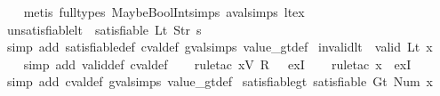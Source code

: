 \begin{isabellebody}
\ \ \isamarkupfalse%
\ {\isacharparenleft}metis\ {\isacharparenleft}full{\isacharunderscore}types{\isacharparenright}\ MaybeBoolInt{\isachardot}simps{\isacharparenleft}{}{\isacharparenright}\ aval{\isachardot}simps{\isacharparenleft}{}{\isacharparenright}\ lt{\isacharunderscore}ex{\isacharparenright}%
\endisatagproof
{\isafoldproof}%
%
\isadelimproof
\isanewline
%
\endisadelimproof
\isanewline
{}\isamarkupfalse%
\ unsatisfiable{\isacharunderscore}lt{\isacharcolon}\ {\isachardoublequoteopen}{\isasymnot}\ satisfiable\ {\isacharparenleft}Lt\ {\isacharparenleft}Str\ s{\isacharparenright}{\isacharparenright}{\isachardoublequoteclose}\isanewline
%
\isadelimproof
\ \ %
\endisadelimproof
%
\isatagproof
{}\isamarkupfalse%
\ {\isacharparenleft}simp\ add{\isacharcolon}\ satisfiable{\isacharunderscore}def\ cval{\isacharunderscore}def\ gval{\isachardot}simps\ value_gt{\isacharunderscore}def{\isacharparenright}%
\endisatagproof
{\isafoldproof}%
%
\isadelimproof
\isanewline
%
\endisadelimproof
\isanewline
{}\isamarkupfalse%
\ invalid{\isacharunderscore}lt{\isacharcolon}\ {\isachardoublequoteopen}{\isasymnot}\ valid\ {\isacharparenleft}Lt\ x{\isacharparenright}{\isachardoublequoteclose}\isanewline
%
\isadelimproof
\ \ %
\endisadelimproof
%
\isatagproof
{}\isamarkupfalse%
\ {\isacharparenleft}simp\ add{\isacharcolon}\ valid{\isacharunderscore}def\ cval{\isacharunderscore}def{\isacharparenright}\isanewline
\ \ \isamarkupfalse%
\ {\isacharparenleft}rule{\isacharunderscore}tac\ x{\isacharequal}{\isachardoublequoteopen}V\ {\isacharparenleft}R\ {}{\isacharparenright}{\isachardoublequoteclose}\ \ exI{\isacharparenright}\isanewline
\ \ \isamarkupfalse%
\ {\isacharparenleft}rule{\isacharunderscore}tac\ x{\isacharequal}{\isachardoublequoteopen}{\isacharless}{\isachargreater}{\isachardoublequoteclose}\ \ exI{\isacharparenright}\isanewline
\ \ \isamarkupfalse%
\ {\isacharparenleft}simp\ add{\isacharcolon}\ cval{\isacharunderscore}def\ gval{\isachardot}simps\ value_gt{\isacharunderscore}def{\isacharparenright}%
\endisatagproof
{\isafoldproof}%
%
\isadelimproof
\isanewline
%
\endisadelimproof
\isanewline
{}\isamarkupfalse%
\ satisfiable{\isacharunderscore}gt{\isacharcolon}\ {\isachardoublequoteopen}satisfiable\ {\isacharparenleft}Gt\ {\isacharparenleft}Num\ x{}{\isacharparenright}{\isacharparenright}{\isachardoublequoteclose}\isanewline
%
\isadelimproof
\ \ %
\endisadelimproof

\end{isabellebody}
